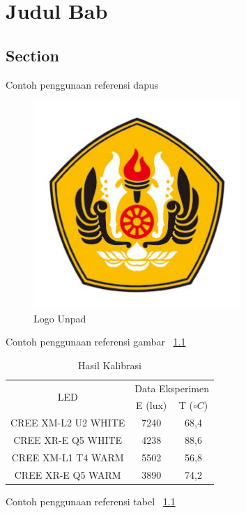 {}
\setcounter{page}{1}
\chapter{Judul Bab}
	\section{Section}


		Contoh penggunaan referensi dapus \cite{ref1}


	\begin{figure}[!htbp] 
		\begin{center} 
		\includegraphics[width=0.7\textwidth,angle=0]{gambar/logounpad.jpg}
		\end{center} 
		\caption{Logo Unpad}
		\label{fig:is}
	\end{figure}


	Contoh penggunaan referensi gambar ~\ref{fig:is}


	\begin{table}[!htbp]
		\centering
	\caption{Hasil Kalibrasi}
	\begin{tabular}{|c|c|c|}
		\hline
	\multirow{2}{*}{LED}    & \multicolumn{2}{|c|}{Data Eksperimen} \\ \cline{2-3}
					 & E (lux)          & T  ($\circ C$)        \\ \hline
	CREE XM-L2 U2 WHITE & 7240                 & 68,4 \\ \hline
	CREE XR-E Q5 WHITE  & 4238                 & 88,6 \\ \hline
	CREE XM-L1 T4 WARM  & 5502                 & 56,8 \\ \hline
	CREE XR-E Q5 WARM   & 3890                 & 74,2 \\ \hline
	\end{tabular}
	\label{tab:kal}
	\end{table}

	
	Contoh penggunaan referensi tabel ~\ref{tab:kal}
